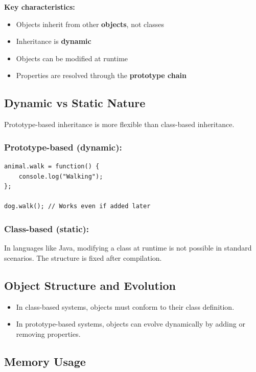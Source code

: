 \documentclass{scrbook}
\begin{document}
\textbf{Key characteristics:}
\begin{itemize}
    \item Objects inherit from other \textbf{objects}, not classes
    \item Inheritance is \textbf{dynamic}
    \item Objects can be modified at runtime
    \item Properties are resolved through the \textbf{prototype chain}
\end{itemize}

\subsection{Dynamic vs Static Nature}

Prototype-based inheritance is more flexible than class-based inheritance.

\subsubsection{Prototype-based (dynamic):}
\begin{lstlisting}
animal.walk = function() {
    console.log("Walking");
};

dog.walk(); // Works even if added later
\end{lstlisting}

\subsubsection{Class-based (static):}
In languages like Java, modifying a class at runtime is not possible in standard scenarios. The structure is fixed after compilation.

\subsection{Object Structure and Evolution}

\begin{itemize}
    \item In class-based systems, objects must conform to their class definition.
    \item In prototype-based systems, objects can evolve dynamically by adding or removing properties.
\end{itemize}

\subsection{Memory Usage}
\end{document}
